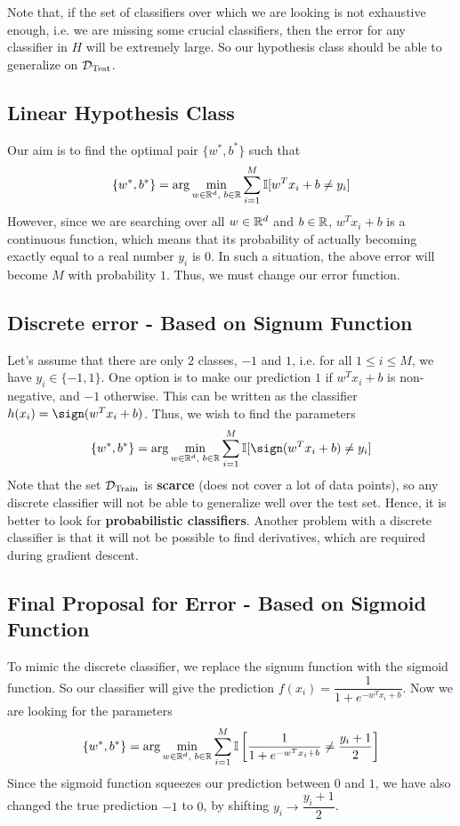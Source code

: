 \documentclass[12pt]{article}
\begin{document}
Note that, if the set of classifiers over which we are looking is not exhaustive enough, i.e. we are missing some crucial classifiers, then the error for any classifier in $H$ will be extremely large. So our hypothesis class should be able to generalize on ${\cal D}_{\textrm{Test}}$.

\subsection{Linear Hypothesis Class}
Our aim is to find the optimal pair $\{w^*, b^*\}$ such that $$\{w^*, b^*\} = \arg \min_{w \in \mathbb R^d, \text{ } b \in \mathbb R} \sum_{i = 1}^M \mathbb{I}[w^Tx_i+b \neq y_i]$$
However, since we are searching over all $w \in \mathbb R^d$ and $b \in \mathbb R$, $w^Tx_i+b$ is a continuous function, which means that its probability of actually becoming exactly equal to a real number $y_i$ is $0$. In such a situation, the above error will become $M$ with probability $1$. Thus, we must change our error function.

\subsection{Discrete error - Based on Signum Function}
Let's assume that there are only $2$ classes, $-1$ and $1$, i.e. for all $1 \leq i \leq M$, we have $y_i \in \{-1, 1\}$. One option is to make our prediction $1$ if $w^Tx_i+b$ is non-negative, and $-1$ otherwise. This can be written as the classifier $h(x_i) = \sign(w^Tx_i+b)$. Thus, we wish to find the parameters $$\{w^*, b^*\} = \arg \min_{w \in \R^d, \text{ } b \in \R} \sum_{i = 1}^M \mathbb{I}[\sign(w^Tx_i+b) \neq y_i]$$
Note that the set ${\cal D}_{\textrm{Train}}$ is {\bf scarce} (does not cover a lot of data points), so any discrete classifier will not be able to generalize well over the test set. Hence, it is better to look for {\bf probabilistic classifiers}. Another problem with a discrete classifier is that it will not be possible to find derivatives, which are required during gradient descent.

\subsection{Final Proposal for Error - Based on Sigmoid Function}
To mimic the discrete classifier, we replace the signum function with the sigmoid function. So our classifier will give the prediction $f(x_i) = \dfrac{1}{1+e^{-w^Tx_i+b}}$. Now we are looking for the parameters $$\{w^*, b^*\} = \arg \min_{w \in \mathbb R^d, \text{ } b \in \mathbb R} \sum_{i = 1}^M \mathbb{I}\left[\dfrac{1}{1+e^{-w^Tx_i+b}} \neq \dfrac{y_i+1}{2} \right]$$
Since the sigmoid function squeezes our prediction between $0$ and $1$, we have also changed the true prediction $-1$ to $0$, by shifting $y_i \longrightarrow \dfrac{y_i+1}{2}$.
\end{document}
